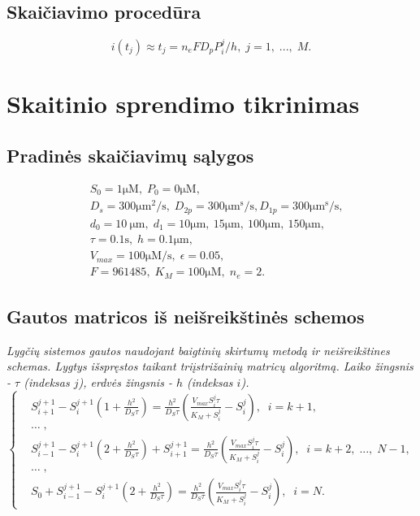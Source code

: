 \documentclass[12pt, a4paper, lithuanian]{article}
\begin{document}
\subsection{Skaičiavimo procedūra}

\begin{equation} 
    i(t_j) \approx t_j = n_eFD_pP_i^j/h,\; j=1,\;...,\;M. 
\end{equation}

\section{Skaitinio sprendimo tikrinimas}
\subsection{Pradinės skaičiavimų sąlygos}
 
 \begin{equation}
 \begin{aligned}
     &S_0 = 1 \mathrm{\mu M},\; P_0 = 0 \mathrm{\mu M},\\
     &D_s = 300 \mathrm{\mu m^2/s},\; D_{2p} = 300 \mathrm{\mu m^s/s}, D_{1p} = 300 \mathrm{\mu m^s/s},\\\
     &d_0 = 10\ \mathrm{\mu m},\; d_1 = 10 \mathrm{\mu
 m},\ 15 \mathrm{\mu m},\ 100 \mathrm{\mu m},\ 150\mathrm{\mu m},\;\\
     &\tau = 0.1\mathrm{s},\; h=0.1 \mathrm{\mu m},\\
     &V_{max} = 100\mathrm{\mu M /s},\; \epsilon = 0.05,\\
     &F=961485,\; K_M= 100\mathrm{\mu M},\; n_e = 2.
 \end{aligned}
 \end{equation}
 
\subsection{Gautos matricos iš neišreikštinės schemos}
\textit{Lygčių sistemos gautos naudojant baigtinių skirtumų metodą ir neišreikštines
schemas. Lygtys išspręstos taikant triįstrižainių matricų algoritmą. Laiko
žingsnis - $\tau$ (indeksas $j$), erdvės žingsnis - $h$ (indeksas $i$).}
\begin{equation}
\left\{
\begin{aligned}
    &S_{i+1}^{j+1}-S_i^{j+1}\left(1+\frac{h^2}{D_S\tau}\right)
= \frac{h^2}{D_S\tau} \left(\frac{V_{max}S_i^j\tau}{K_M+S_i^j}-S_i^j\right),\; \;
i = k +1,\\
    &\dots\;,\\
    &S_{i-1}^{j+1}-S_i^{j+1}\left(2+\frac{h^2}{D_S\tau}\right)+S_{i+1}^{j+1}
        = \frac{h^2}{D_S\tau}
        \left(\frac{V_{max}S_i^j\tau}{K_M+S_i^j}-S_i^j\right),\; \; i =
        k +2,\;...,\;N-1,\\
    &\dots\;,\\
    &S_0 + S_{i-1}^{j+1} - S_i^{j+1}\left(2+\frac{h^2}{D_S\tau}\right)
        =  \frac{h^2}{D_S\tau}
    \left(\frac{V_{max}S_i^j\tau}{K_M+S_i^j}-S_i^j\right),\; \; i = N.
\end{aligned}
\right.
\end{equation}
\end{document}
